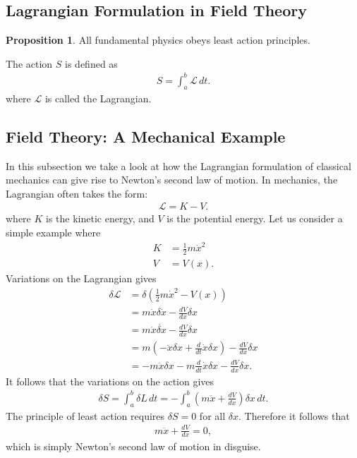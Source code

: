 \documentclass[a4paper,11pt]{article}
\numberwithin{equation}{section}
\theoremstyle{definition}
\newtheorem{prop}{Proposition}[section]
\begin{document}
\subsection{Lagrangian Formulation in Field Theory}
\begin{prop}
	All fundamental physics obeys least action principles.
\end{prop}
The action $S$ is defined as
\begin{align*}
S = \int_{a}^{b}\mathcal{L}\,dt.
\end{align*}
where $\mathcal{L}$ is called the Lagrangian. 
\subsection{Field Theory: A Mechanical Example}
In this subsection we take a look at how the Lagrangian formulation of classical mechanics can give rise to Newton's second law of motion. In mechanics, the Lagrangian often takes the form:
\begin{align}
\mathcal{L} = K - V.
\end{align}
where $K$ is the kinetic energy, and $V$ is the potential energy. Let us consider a simple example where
\begin{align*}
K &= \frac{1}{2}m\dot{x}^2\\
V &= V(x).
\end{align*}
Variations on the Lagrangian gives
\begin{align*}
\delta \mathcal{L} &= \delta\left( \frac{1}{2}m\dot{x}^2 - V(x) \right)\\
&= m\dot{x}\delta \dot{x} - \frac{dV}{dx}\delta x\\
&= m\dot{x}\dot{\delta x} - \frac{dV}{dx}\delta x\\
&= m \left( -\ddot{x}\delta x + \frac{d}{dt}\dot{x}\delta x \right) - \frac{dV}{dx}\delta x\\
&= -m\ddot{x}\delta x - m\frac{d}{dt}\dot{x}\delta x - \frac{dV}{dx}\delta x. 
\end{align*}
It follows that the variations on the action gives
\begin{align*}
\delta S = \int_{a}^{b}\delta L \,dt = -\int_a^b\left( m\ddot{x} + \frac{dV}{dx} \right)\delta x\,dt.
\end{align*}
The principle of least action requires $\delta S = 0$ for all $\delta x$. Therefore it follows that
\begin{align*}
m\ddot{x} + \frac{dV}{dx} = 0,
\end{align*}
which is simply Newton's second law of motion in disguise. \\
\end{document}
